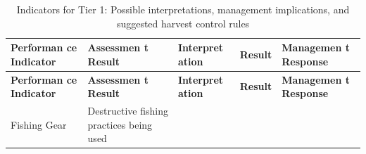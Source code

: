 \documentclass[]{book}
\begin{document}
\begin{longtable}[]{@{}lllll@{}}
\caption{\label{tab:hcrs-1} Indicators for Tier 1: Possible interpretations,
management implications, and suggested harvest control
rules}\tabularnewline
\toprule
\begin{minipage}[b]{0.17\columnwidth}\raggedright\strut
\textbf{Performan ce Indicator}\strut
\end{minipage} & \begin{minipage}[b]{0.17\columnwidth}\raggedright\strut
\textbf{Assessmen t Result}\strut
\end{minipage} & \begin{minipage}[b]{0.17\columnwidth}\raggedright\strut
\textbf{Interpret ation}\strut
\end{minipage} & \begin{minipage}[b]{0.17\columnwidth}\raggedright\strut
\textbf{Result}\strut
\end{minipage} & \begin{minipage}[b]{0.17\columnwidth}\raggedright\strut
\textbf{Managemen t Response}\strut
\end{minipage}\tabularnewline
\midrule
\endfirsthead
\toprule
\begin{minipage}[b]{0.17\columnwidth}\raggedright\strut
\textbf{Performan ce Indicator}\strut
\end{minipage} & \begin{minipage}[b]{0.17\columnwidth}\raggedright\strut
\textbf{Assessmen t Result}\strut
\end{minipage} & \begin{minipage}[b]{0.17\columnwidth}\raggedright\strut
\textbf{Interpret ation}\strut
\end{minipage} & \begin{minipage}[b]{0.17\columnwidth}\raggedright\strut
\textbf{Result}\strut
\end{minipage} & \begin{minipage}[b]{0.17\columnwidth}\raggedright\strut
\textbf{Managemen t Response}\strut
\end{minipage}\tabularnewline
\midrule
\endhead
\begin{minipage}[t]{0.19\columnwidth}\raggedright\strut
Fishing Gear\strut
\end{minipage} & \begin{minipage}[t]{0.19\columnwidth}\raggedright\strut
Destructive fishing practices being used\strut
\end{minipage} & \begin{minipage}[t]{0.19\columnwidth}\raggedright\strut

\end{minipage}
\end{longtable}
\end{document}
